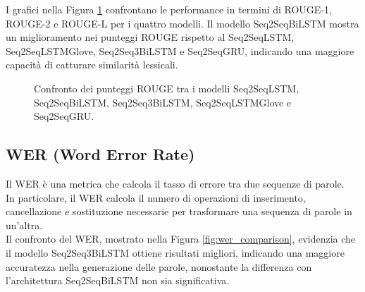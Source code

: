 I grafici nella Figura \ref{fig:rouge_comparison} confrontano le performance in termini di ROUGE-1, ROUGE-2 e ROUGE-L per i quattro modelli. Il modello Seq2SeqBiLSTM mostra un miglioramento nei punteggi ROUGE rispetto al Seq2SeqLSTM, Seq2SeqLSTMGlove, Seq2Seq3BiLSTM e Seq2SeqGRU, indicando una maggiore capacit\`a di catturare similarit\`a lessicali.
\begin{figure}[H]
    \centering
    \hfill
    \hfill
    \hfill
    \hfill
    \hfill

    \hfill
    \hfill
    \hfill
    \hfill
    \hfill

    \hfill
    \hfill
    \hfill
    \hfill
    \hfill

    \caption{Confronto dei punteggi ROUGE tra i modelli Seq2SeqLSTM, Seq2SeqBiLSTM, Seq2Seq3BiLSTM, Seq2SeqLSTMGlove e Seq2SeqGRU.}
    \label{fig:rouge_comparison}
\end{figure}

\subsection{WER (Word Error Rate)}
Il WER \`e una metrica che calcola il tasso di errore tra due sequenze di parole.\\
In particolare, il WER calcola il numero di operazioni di inserimento, cancellazione e sostituzione necessarie per trasformare una sequenza di parole in un'altra.\\

Il confronto del WER, mostrato nella Figura \ref{fig:wer_comparison}, evidenzia che il modello Seq2Seq3BiLSTM ottiene risultati migliori, indicando una maggiore accuratezza nella generazione delle parole, nonostante la differenza con l'architettura Seq2SeqBiLSTM non sia significativa.\\

